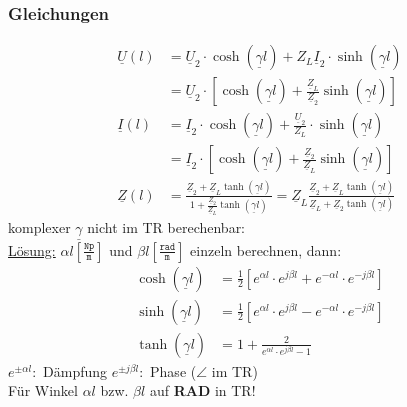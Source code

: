 \subsubsection{Gleichungen}\label{sec:Leitungen_allg_Gleichungen}
\begin{align*}
	\underline{U}(l)& = \underline{U}_2 \cdot \cosh(\underline{\gamma}l) + Z_L \underline{I}_2 \cdot \sinh(\underline{\gamma}l)\\
	& = \underline{U}_2 \cdot \left[ \cosh(\underline{\gamma} l) + \tfrac{\underline{Z}_L}{\underline{Z}_2} \sinh(\underline{\gamma} l) \right]\\
	\underline{I}(l)& = \underline{I}_2 \cdot \cosh(\underline{\gamma}l) + \frac{\underline{U}_2}{Z_L} \cdot \sinh(\underline{\gamma}l)\\
	& = \underline{I}_2 \cdot \left[ \cosh(\underline{\gamma} l) + \tfrac{\underline{Z}_2}{\underline{Z}_L} \sinh(\underline{\gamma} l) \right]\\
	\underline{Z}(l) & = \frac{\underline{Z}_2+ \underline{Z}_L\tanh(\underline{\gamma} 
		l)}{1+\frac{\underline{Z}_2}{\underline{Z}_L}\tanh(\underline{\gamma} l)} =
		\underline{Z}_L \frac{\underline{Z}_2+ \underline{Z}_L\tanh(\underline{\gamma} 
		l)}{{\underline{Z}_L}+{\underline{Z}_2}\tanh(\underline{\gamma} l)}
\end{align*}
komplexer $\underline{\gamma}$ nicht im TR berechenbar:\\
\underline{Lösung:} $\alpha l \left[ \tfrac{\texttt{Np}}{\texttt{m}} \right] $ und $ \beta l \left[ \tfrac{\texttt{rad}}{\texttt{m}} \right] $ einzeln berechnen, dann:
\begin{align*}
	\cosh(\underline{\gamma}l) &= \frac{1}{2} \left[e^{\alpha l} \cdot e^{j\beta l} + e^{-\alpha l} \cdot e^{-j\beta l} \right]\\
	\sinh (\underline{\gamma}l)&= \frac{1}{2} \left[e^{\alpha l} \cdot e^{j\beta l} - e^{-\alpha l} \cdot e^{-j\beta l} \right]\\
	\tanh(\underline{\gamma}l) &= 
	1+\frac{2}{e^{\alpha l} \cdot e^{j\beta l}-1}
\end{align*}
  $e^{\pm \alpha l }:$ Dämpfung \qquad $e^{\pm j\beta l}:$ Phase ($\angle$ im TR)\\
  Für Winkel $\alpha l$ bzw. $ \beta l$ auf \textbf{RAD} in TR!
